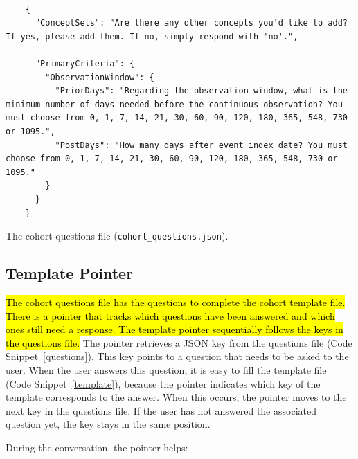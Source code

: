 \begin{listing}[H]
  \begin{verbatim}
      
    {
      "ConceptSets": "Are there any other concepts you'd like to add? If yes, please add them. If no, simply respond with 'no'.",
    
      "PrimaryCriteria": {
        "ObservationWindow": {
          "PriorDays": "Regarding the observation window, what is the minimum number of days needed before the continuous observation? You must choose from 0, 1, 7, 14, 21, 30, 60, 90, 120, 180, 365, 548, 730 or 1095.",
          "PostDays": "How many days after event index date? You must choose from 0, 1, 7, 14, 21, 30, 60, 90, 120, 180, 365, 548, 730 or 1095."
        }
      }
    }

  \end{verbatim}
  \caption[The cohort questions file]{The cohort questions file {\small\normalfont(\texttt{cohort\_questions.json})}.}
  \label{questions}
\end{listing}



\subsection{Template Pointer}




\hl{The cohort questions file has the questions to complete the cohort template file. There is a pointer that tracks which questions have been answered and which ones still need a response. The template pointer sequentially follows the keys in the questions file.} The pointer retrieves a JSON key from the questions file (Code Snippet~\ref{questions}). This key points to a question that needs to be asked to the user. When the user answers this question, it is easy to fill the template file (Code Snippet~\ref{template}), because the pointer indicates which key of the template corresponds to the answer. When this occurs, the pointer moves to the next key in the questions file. If the user has not answered the associated question yet, the key stays in the same position.

During the conversation, the pointer helps:

